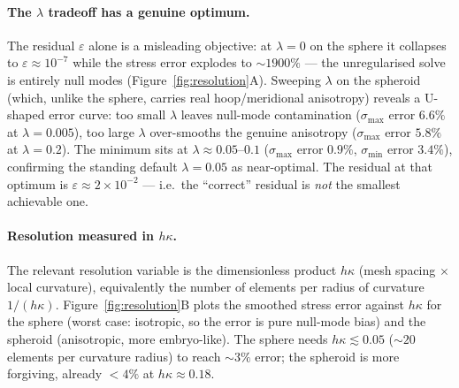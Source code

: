 \documentclass[11pt]{article}
\begin{document}
\paragraph{The $\lambda$ tradeoff has a genuine optimum.}
The residual $\varepsilon$ alone is a misleading objective: at $\lambda=0$
on the sphere it collapses to $\varepsilon\approx10^{-7}$ while the stress
error explodes to ${\sim}1900\%$ — the unregularised solve is entirely
null modes (Figure~\ref{fig:resolution}A).  Sweeping $\lambda$ on the
spheroid (which, unlike the sphere, carries real hoop/meridional
anisotropy) reveals a U-shaped error curve: too small $\lambda$ leaves
null-mode contamination ($\sigma_{\max}$ error $6.6\%$ at $\lambda=0.005$),
too large $\lambda$ over-smooths the genuine anisotropy ($\sigma_{\max}$
error $5.8\%$ at $\lambda=0.2$).  The minimum sits at
$\lambda\approx0.05$--$0.1$ ($\sigma_{\max}$ error $0.9\%$,
$\sigma_{\min}$ error $3.4\%$), confirming the standing default
$\lambda=0.05$ as near-optimal.  The residual at that optimum is
$\varepsilon\approx2\times10^{-2}$ — i.e.\ the ``correct'' residual is
\emph{not} the smallest achievable one.

\paragraph{Resolution measured in $h\kappa$.}
The relevant resolution variable is the dimensionless product
$h\kappa$ (mesh spacing $\times$ local curvature), equivalently the number
of elements per radius of curvature $1/(h\kappa)$.
Figure~\ref{fig:resolution}B plots the smoothed stress error against
$h\kappa$ for the sphere (worst case: isotropic, so the error is pure
null-mode bias) and the spheroid (anisotropic, more embryo-like).  The
sphere needs $h\kappa\lesssim0.05$ (${\sim}20$ elements per curvature
radius) to reach ${\sim}3\%$ error; the spheroid is more forgiving,
already $<4\%$ at $h\kappa\approx0.18$.
\end{document}

